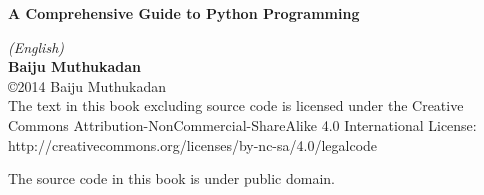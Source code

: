 \newpage
\setcounter{page}{2}

\textbf{A Comprehensive Guide to Python Programming}




\textit{(English)}\\[3mm]

\textbf{Baiju Muthukadan}\\[3mm]

\copyright 2014 Baiju Muthukadan\\

The text in this book excluding source code is licensed under the
Creative Commons Attribution-NonCommercial-ShareAlike 4.0
International License:\\
http://creativecommons.org/licenses/by-nc-sa/4.0/legalcode

The source code in this book is under public domain.

